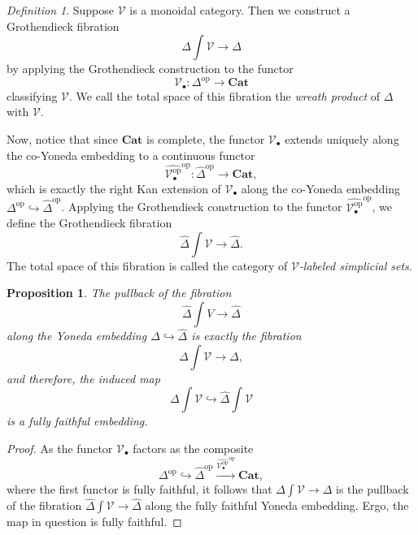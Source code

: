 \documentclass{amsart}
\numberwithin{equation}{section}
\theoremstyle{plain}   %
\newtheorem{prop}[subsection]{Proposition}
\theoremstyle{remark}
\newtheorem{defn}[subsection]{Definition}
\theoremstyle{plain}
\newcommand{\op}{\ensuremath{\mathrm{op}}}
\newcommand{\Cat}{\ensuremath{\mathbf{Cat}}}
\newcommand{\psh}[1]{\ensuremath{\widehat{#1}}}
\begin{document}
\begin{defn}
	Suppose \(\mathcal{V}\) is a monoidal category.  Then we construct a Grothendieck fibration \[\Delta\int\mathcal{V}\to \Delta\] by applying the Grothendieck construction to the functor \[\mathcal{V}_\bullet:\Delta^\op\to \Cat\] classifying \(\mathcal{V}\). We call the total space of this fibration the \emph{wreath product} of \(\Delta\) with \(\mathcal{V}\).

	Now, notice that since \(\Cat\) is complete, the functor \(\mathcal{V}_\bullet\) extends uniquely along the co-Yoneda embedding to a continuous functor 
	\[\psh{\mathcal{V}^\op_\bullet}^\op: \psh{\Delta}^\op \to \Cat,\]
	which is exactly the right Kan extension of \(\mathcal{V}_\bullet\) along the co-Yoneda embedding \(\Delta^\op \hookrightarrow \psh{\Delta}^\op\).  Applying the Grothendieck construction to the functor \(\psh{\mathcal{V}^\op_\bullet}^\op\), we define the Grothendieck fibration \[\psh{\Delta}\int \mathcal{V} \to \psh{\Delta}.\] The total space of this fibration is called the category of \emph{\(\mathcal{V}\)-labeled simplicial sets}.
	


\end{defn}

\begin{prop} The pullback of the fibration \[\psh{\Delta}\int V \to \psh{\Delta}\] along the Yoneda embedding \(\Delta\hookrightarrow \psh{\Delta}\) is exactly the fibration \[\Delta\int\mathcal{V}\to \Delta,\] and therefore, the induced map \[\Delta\int\mathcal{V}\hookrightarrow \psh{\Delta}\int\mathcal{V}\] is a fully faithful embedding.
\end{prop}
\begin{proof}  As the functor \(\mathcal{V}_\bullet\) factors as the composite 
	\[\Delta^\op \hookrightarrow \psh{\Delta}^\op \xrightarrow{\psh{\mathcal{V}^\op_\bullet}^\op} \Cat,\] where the first functor is fully faithful, it follows that \(\Delta\int \mathcal{V} \to \Delta\) is the pullback of the fibration \(\psh{\Delta}\int \mathcal{V} \to \psh{\Delta}\) along the fully faithful Yoneda embedding.  Ergo, the map in question is fully faithful.  
\end{proof}
\end{document}

